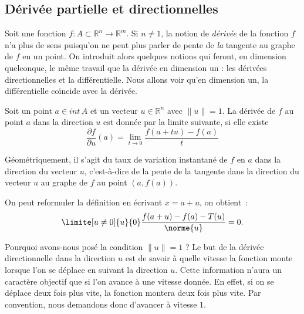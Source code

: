                     \subsection{Dérivée partielle et directionnelles}

Soit une fonction $f:A\subset \mathbb{R}^n \rightarrow \mathbb{R}^m$. Si $n\neq 1$, la notion de \emph{dérivée} de la fonction $f$ n'a plus de sens puisqu'on ne peut plus parler de pente de \emph{la} tangente au graphe de $f$ en un point. On introduit alors quelques notions qui feront, en dimension quelconque, le même travail que la dérivée en dimension un : les dérivées directionnelles et la différentielle. Nous allons voir qu'en dimension un, la différentielle coïncide avec la dérivée.


\begin{definition} 
    Soit un point $a \in int\,A$ et un vecteur $u \in \mathbb{R}^n$ avec $\| u \| =1$. La dérivée de $f$ au point $a$ dans la direction $u$ est donnée par la limite suivante, si elle existe 
    \begin{equation}
        \frac{\partial f}{\partial u}(a) = \lim_{t\rightarrow 0}\frac{f(a+tu) - f(a)}{t}
    \end{equation}
\end{definition}

Géométriquement, il s'agit du taux de variation instantané de $f$ en $a$ dans la direction du vecteur $u$, c'est-à-dire de la pente de la tangente dans la direction du vecteur $u$ au graphe de $f$ au point $(a, f(a))$.

\begin{remark}
On peut reformuler la définition en écrivant $x = a + u$, on obtient~:
\begin{equation}
    \limite[u\neq 0]{u}{0} \frac{f(a+u)-f(a)-T(u)}{\norme{u}} = 0.
\end{equation}
\end{remark}

\begin{remark}
Pourquoi avons-nous posé la condition $\| u \|=1$ ? Le but de la dérivée directionnelle dans la direction $u$ est de savoir à quelle vitesse la fonction monte lorsque l'on se déplace en suivant la direction $u$. Cette information n'aura un caractère \og objectif\fg{} que si l'on avance à une vitesse donnée. En effet, si on se déplace deux fois plus vite, la fonction montera deux fois plus vite. Par convention, nous demandons donc d'avancer à vitesse $1$.
\end{remark}

